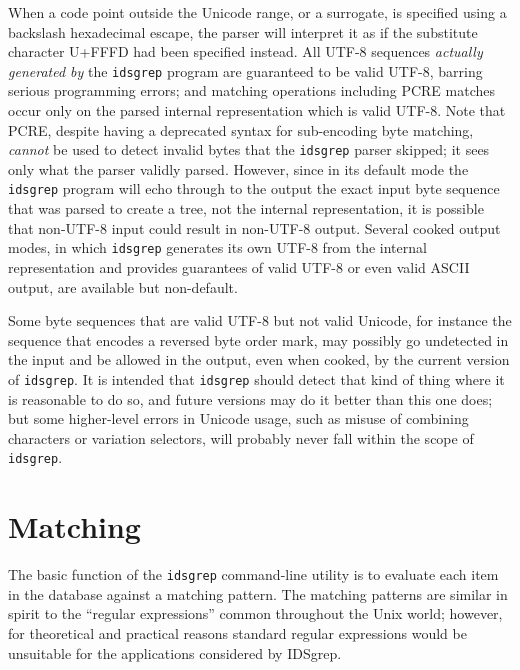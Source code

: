 \documentclass[twocolumn]{report}
\begin{document}
When a code point outside the Unicode range, or a surrogate, is specified
using a backslash hexadecimal escape, the parser will interpret it as if the
substitute character U+FFFD had been specified instead.  All UTF-8 sequences
\emph{actually generated by} the \texttt{idsgrep} program are guaranteed to
be valid UTF-8, barring serious programming errors; and matching operations
including PCRE matches occur only on the parsed internal representation
which is valid UTF-8.  Note that PCRE, despite having a deprecated syntax
for sub-encoding byte matching, \emph{cannot} be used to detect invalid bytes
that the \texttt{idsgrep} parser skipped; it sees only what the parser
validly parsed.  However, since in its default mode the \texttt{idsgrep}
program will echo through to the output the exact input byte sequence that
was parsed to create a tree, not the internal representation, it is possible
that non-UTF-8 input could result in non-UTF-8 output.  Several cooked
output modes, in which \texttt{idsgrep} generates its own UTF-8 from the
internal representation and provides guarantees of valid UTF-8 or even valid
ASCII output, are available but non-default.

Some byte sequences that are valid UTF-8 but not valid Unicode, for instance
the sequence that encodes a reversed byte order mark, may possibly go
undetected in the input and be allowed in the output, even when cooked, by
the current version of \texttt{idsgrep}.  It is intended that
\texttt{idsgrep} should detect that kind of thing where it is reasonable to
do so, and future versions may do it better than this one does; but some
higher-level errors in Unicode usage, such as misuse of combining characters
or variation selectors, will probably never fall within the scope of
\texttt{idsgrep}.


\section{Matching}

The basic function of the \texttt{idsgrep} command-line utility is to
evaluate each item in the database against a matching pattern.  The matching
patterns are similar in spirit to the ``regular expressions'' common
throughout the Unix world; however, for theoretical and practical reasons
standard regular expressions would be unsuitable for the applications
considered by IDSgrep.
\end{document}
